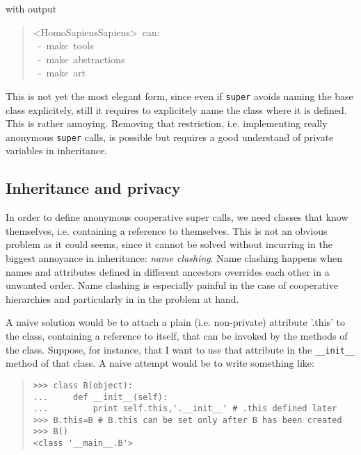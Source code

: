 \documentclass[10pt,english]{article}
\begin{document}
with output
\begin{quote}
\begin{ttfamily}\begin{flushleft}
\mbox{<HomoSapiensSapiens>~can:}\\
\mbox{~-~make~tools}\\
\mbox{~-~make~abstractions}\\
\mbox{~-~make~art}
\end{flushleft}\end{ttfamily}
\end{quote}

This is not yet the most elegant form, since even
if \texttt{super} avoids naming the base class explicitely, still it
requires to explicitely name the class where it is defined. This is
rather annoying.
Removing that restriction, i.e. implementing really anonymous 
\texttt{super} calls, is possible but requires a good understand of
private variables in inheritance.



\hypertarget{inheritance-and-privacy}{}
\subsection*{Inheritance and privacy}

In order to define anonymous cooperative super calls,  we need classes 
that know themselves, i.e. containing a reference to themselves. This
is not an obvious problem as it could seems, since it cannot be solved
without incurring in the biggest annoyance in inheritance: 
\emph{name clashing}. Name clashing happens when names and attributes defined 
in different ancestors overrides each other in a unwanted order.
Name clashing is especially painful in the case of cooperative 
hierarchies and particularly in in the problem at hand.

A naive solution would be to attach a plain (i.e. non-private) 
attribute '.this' to the class, containing a reference
to itself, that can be invoked by the methods of the class.
Suppose, for instance, that I want to use that attribute in the \texttt{{\_}{\_}init{\_}{\_}}
method of that class. A naive attempt would be to write something like:
\begin{quote}
\begin{verbatim}>>> class B(object):
...     def __init__(self): 
...         print self.this,'.__init__' # .this defined later
>>> B.this=B # B.this can be set only after B has been created
>>> B()
<class '__main__.B'>\end{verbatim}
\end{quote}
\end{document}
